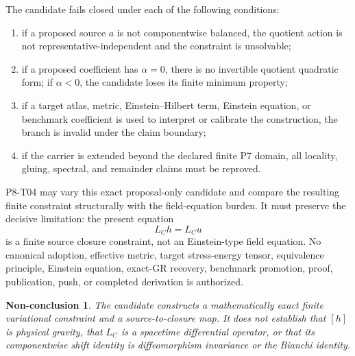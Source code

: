 \documentclass[11pt]{article}
\newtheorem{nonconclusion}{Non-conclusion}
\begin{document}
The candidate fails closed under each of the following conditions:
\begin{enumerate}
\item if a proposed source \(a\) is not componentwise balanced, the quotient
action is not representative-independent and the constraint is unsolvable;
\item if a proposed coefficient has \(\alpha=0\), there is no invertible
quotient quadratic form; if \(\alpha<0\), the candidate loses its finite
minimum property;
\item if a target atlas, metric, Einstein--Hilbert term, Einstein equation,
or benchmark coefficient is used to interpret or calibrate the construction,
the branch is invalid under the claim boundary;
\item if the carrier is extended beyond the declared finite P7 domain, all
locality, gluing, spectral, and remainder claims must be reproved.
\end{enumerate}

P8-T04 may vary this exact proposal-only candidate and compare the resulting
finite constraint structurally with the field-equation burden.  It must
preserve the decisive limitation: the present equation
\[
  L_Ch=L_Cu
\]
is a finite source closure constraint, not an Einstein-type field equation.
No canonical adoption, effective metric, target stress-energy tensor,
equivalence principle, Einstein equation, exact-GR recovery, benchmark
promotion, proof, publication, push, or completed derivation is authorized.

\begin{nonconclusion}
The candidate constructs a mathematically exact finite variational constraint
and a source-to-closure map.  It does not establish that \([h]\) is physical
gravity, that \(L_C\) is a spacetime differential operator, or that its
componentwise shift identity is diffeomorphism invariance or the Bianchi
identity.
\end{nonconclusion}
\end{document}
